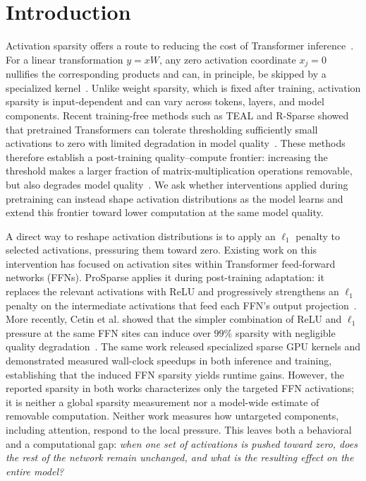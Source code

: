 
\section{Introduction}

Activation sparsity offers a route to reducing the cost of Transformer inference~\cite{liu2025teal,zhang2025rsparse}. For a linear transformation \(y=xW\), any zero activation coordinate \(x_j=0\) nullifies the corresponding products and can, in principle, be skipped by a specialized kernel~\cite{lee2024cats,liu2025teal,zhang2025rsparse}. Unlike weight sparsity, which is fixed after training, activation sparsity is input-dependent and can vary across tokens, layers, and model components. Recent training-free methods such as TEAL and R-Sparse showed that pretrained Transformers can tolerate thresholding sufficiently small activations to zero with limited degradation in model quality~\cite{liu2025teal,zhang2025rsparse}. These methods therefore establish a post-training quality--compute frontier: increasing the threshold makes a larger fraction of matrix-multiplication operations removable, but also degrades model quality~\cite{lee2024cats,he2024chess,liu2025teal,zhang2025rsparse}. We ask whether interventions applied during pretraining can instead shape activation distributions as the model learns and extend this frontier toward lower computation at the same model quality.

A direct way to reshape activation distributions is to apply an \(\ell_1\) penalty to selected activations, pressuring them toward zero. Existing work on this intervention has focused on activation sites within Transformer feed-forward networks (FFNs). ProSparse applies it during post-training adaptation: it replaces the relevant activations with ReLU and progressively strengthens an \(\ell_1\) penalty on the intermediate activations that feed each FFN's output projection~\cite{song2025prosparse}. More recently, Cetin et al. showed that the simpler combination of ReLU and \(\ell_1\) pressure at the same FFN sites can induce over \(99\%\) sparsity with negligible quality degradation~\cite{cetin2026sparser}. The same work released specialized sparse GPU kernels and demonstrated measured wall-clock speedups in both inference and training, establishing that the induced FFN sparsity yields runtime gains. However, the reported sparsity in both works characterizes only the targeted FFN activations; it is neither a global sparsity measurement nor a model-wide estimate of removable computation. Neither work measures how untargeted components, including attention, respond to the local pressure. This leaves both a behavioral and a computational gap: \emph{when one set of activations is pushed toward zero, does the rest of the network remain unchanged, and what is the resulting effect on the entire model?}

